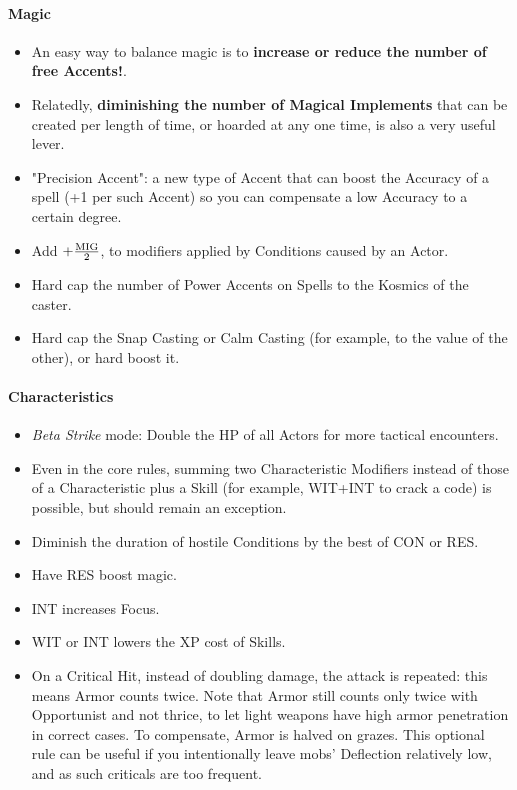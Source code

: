 \paragraph{Magic}

\begin{itemize}
    \item An easy way to balance magic is to \textbf{increase or reduce the number of free Accents!}.
    \item Relatedly, \textbf{diminishing the number of Magical Implements} that can be created per length of time, or hoarded at any one time, is also a very useful lever.
    \item "Precision Accent": a new type of Accent that can boost the Accuracy of a spell (+1 per such Accent) so you can compensate a low Accuracy to a certain degree.
    \item Add $+\frac{\textup{MIG}}{2}$, to modifiers applied by Conditions caused by an Actor.
    \item Hard cap the number of Power Accents on Spells to the Kosmics of the caster.
    \item Hard cap the Snap Casting or Calm Casting (for example, to the value of the other), or hard boost it.
\end{itemize}


\paragraph{Characteristics}

\begin{itemize}
    \item \textit{Beta Strike} mode: Double the HP of all Actors for more tactical encounters.
    \item Even in the core rules, summing two Characteristic Modifiers instead of those of a Characteristic plus a Skill (for example, WIT+INT to crack a code) is possible, but should remain an exception.
    \item Diminish the duration of hostile Conditions by the best of CON or RES.
    \item Have RES boost magic.
    \item INT increases Focus.
    \item WIT or INT lowers the XP cost of Skills.
    \item On a Critical Hit, instead of doubling damage, the attack is repeated: this means Armor counts twice. Note that Armor still counts only twice with Opportunist and not thrice, to let light weapons have high armor penetration in correct cases. To compensate, Armor is halved on grazes. This optional rule can be useful if you intentionally leave mobs' Deflection relatively low, and as such criticals are too frequent. 
\end{itemize}




